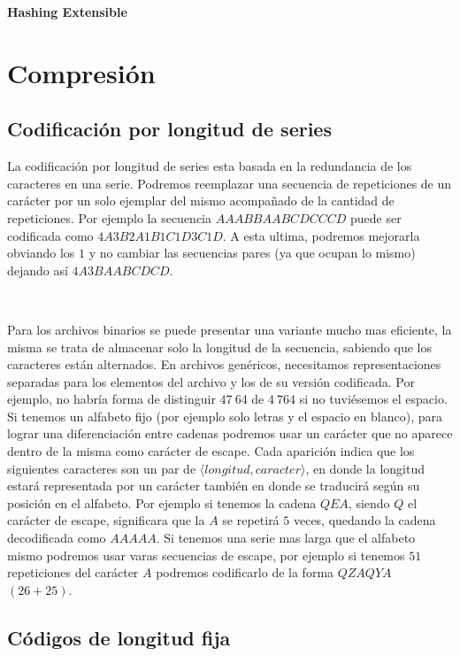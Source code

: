 \textbf{Hashing Extensible}

\newpage
\section{Compresi\'on}
\subsection{Codificaci\'on por longitud de series}

La codificaci\'on por longitud de series esta basada en la redundancia de los caracteres en una serie. Podremos reemplazar una secuencia de repeticiones de un car\'acter por un solo ejemplar del mismo acompa\~nado de la cantidad de repeticiones. Por ejemplo la secuencia $AAABBAABCDCCCD$ puede ser codificada como $4A3B2A1B1C1D3C1D$. A esta ultima, podremos mejorarla obviando los $1$ y no cambiar las secuencias pares (ya que ocupan lo mismo) dejando as\'i $4A3BAABCDCD$.

~

Para los archivos binarios se puede presentar una variante mucho mas eficiente, la misma se trata de almacenar solo la longitud de la secuencia, sabiendo que los caracteres est\'an alternados. En archivos gen\'ericos, necesitamos representaciones separadas para los elementos del archivo y los de su versi\'on codificada. Por ejemplo, no habr\'ia forma de distinguir $47\ 64$ de $4\ 764$ si no tuvi\'esemos el espacio. Si tenemos un alfabeto fijo (por ejemplo solo letras y el espacio en blanco), para lograr una diferenciaci\'on entre cadenas podremos usar un car\'acter que no aparece dentro de la misma como car\'acter de escape. Cada aparici\'on indica que los siguientes caracteres son un par de $\langle longitud, caracter \rangle$, en donde la longitud estar\'a representada por un car\'acter tambi\'en en donde se traducir\'a seg\'un su posici\'on en el alfabeto. Por ejemplo si tenemos la cadena $QEA$, siendo $Q$ el car\'acter de escape, significara que la $A$ se repetir\'a $5$ veces, quedando la cadena
decodificada como $AAAAA$. Si tenemos una serie mas larga que el alfabeto mismo podremos usar varas secuencias de escape, por ejemplo si tenemos $51$ repeticiones del car\'acter $A$ podremos codificarlo de la forma $QZAQYA$ $(26+25)$.

\subsection{C\'odigos de longitud fija}


